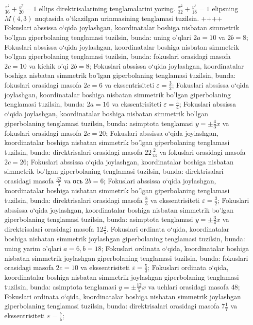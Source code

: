 $\frac{x^2}{36}+\frac{y^2}{20}=1$ ellips direktrisalarining tenglamalarini yozing.
$\frac{x^2}{32}+\frac{y^2}{18}=1$ elipsning $M(4,3)$ nuqtasida o'tkazilgan urinmasining tenglamasi tuzilsin.
++++
Fokuslari abssissa o‘qida joylashgan, koordinatalar boshiga nisbatan simmetrik bo'lgan giperbolaning tenglamasi tuzilsin, bunda: uning o'qlari $2 a=10$ va $2 b=8$;
Fokuslari abssissa o‘qida joylashgan, koordinatalar boshiga nisbatan simmetrik bo'lgan giperbolaning tenglamasi tuzilsin, bunda: fokuslari orasidagi masofa $2 c=10$ va kichik o'qi $2 b=8$;
Fokuslari abssissa o‘qida joylashgan, koordinatalar boshiga nisbatan simmetrik bo'lgan giperbolaning tenglamasi tuzilsin, bunda: fokuslari orasidagi masofa $2 c=6$ va ekssentrisiteti $\varepsilon=\frac{3}{2}$;
Fokuslari abssissa o‘qida joylashgan, koordinatalar boshiga nisbatan simmetrik bo'lgan giperbolaning tenglamasi tuzilsin, bunda: $2 a=16$ va ekssentrisiteti $\varepsilon=\frac{5}{4}$;
Fokuslari abssissa o‘qida joylashgan, koordinatalar boshiga nisbatan simmetrik bo'lgan giperbolaning tenglamasi tuzilsin, bunda: asimptota tenglamasi $y= \pm \frac{4}{3} x$ va fokuslari orasidagi masofa $2 c=20$;
Fokuslari abssissa o‘qida joylashgan, koordinatalar boshiga nisbatan simmetrik bo'lgan giperbolaning tenglamasi tuzilsin, bunda: direktrisalari orasidagi masofa $22 \frac{2}{13}$ va fokuslari orasidagi masofa $2 c=26$;
Fokuslari abssissa o‘qida joylashgan, koordinatalar boshiga nisbatan simmetrik bo'lgan giperbolaning tenglamasi tuzilsin, bunda: direktrisalari orasidagi masofa $\frac{32}{5}$ va ось $2 b=6$;
Fokuslari abssissa o‘qida joylashgan, koordinatalar boshiga nisbatan simmetrik bo'lgan giperbolaning tenglamasi tuzilsin, bunda: direktrisalari orasidagi masofa $\frac{8}{3}$ va ekssentrisiteti $\varepsilon=\frac{3}{2}$;
Fokuslari abssissa o‘qida joylashgan, koordinatalar boshiga nisbatan simmetrik bo'lgan giperbolaning tenglamasi tuzilsin, bunda: asimptota tenglamasi $y= \pm \frac{3}{4} x$ va direktrisalari orasidagi masofa $12 \frac{4}{5}$.
Fokuslari ordinata o‘qida, koordinatalar boshiga nisbatan simmetrik joylashgan giperbolaning tenglamasi tuzilsin, bunda: uning yarim o'qlari $a=6, b=18$;
Fokuslari ordinata o‘qida, koordinatalar boshiga nisbatan simmetrik joylashgan giperbolaning tenglamasi tuzilsin, bunda: fokuslari orasidagi masofa $2 c=10$ va ekssentrisiteti $\varepsilon=\frac{5}{3}$;
Fokuslari ordinata o‘qida, koordinatalar boshiga nisbatan simmetrik joylashgan giperbolaning tenglamasi tuzilsin, bunda: asimptota tenglamasi $y= \pm \frac{12}{5} x$ va uchlari orasidagi masofa 48;
Fokuslari ordinata o‘qida, koordinatalar boshiga nisbatan simmetrik joylashgan giperbolaning tenglamasi tuzilsin, bunda: direktrisalari orasidagi masofa $7 \frac{1}{7}$ va ekssentrisiteti $\varepsilon=\frac{7}{5}$;
